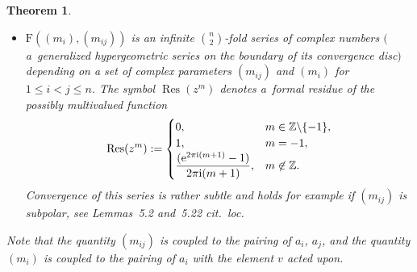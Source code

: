 \documentclass[10pt,a4paper]{amsart}
\numberwithin{equation}{section}
\newtheorem{teo}{Theorem}[section]
\newcommand{\Z}{\mathbb{Z}}
\newcommand{\Fp}{\mathrm{F}}
\begin{document}
\begin{teo}
\begin{itemize}
\begin{itemize}
	\end{itemize}
	\item $\Fp((m_i),(m_{ij}))$ is an infinite ${n\choose 2}$-fold series of complex numbers $($a~generalized hypergeometric series on the boundary of its convergence disc$)$ depending on a set of complex parameters $(m_{ij})$ and $(m_i)$ for $1\leq i<j\leq n$. The symbol $\operatorname{Res}(z^m)$ denotes a~formal residue of the possibly multivalued function
	\[\operatorname{Res}(z^m)
	 :=  \begin{cases}
	0, & m\in\Z \backslash\{-1\},\\
	1, & m= -1,\\
	\dfrac{({\rm e}^{2\pi{\rm i} (m+1)}-1)}{2\pi{\rm i}(m+1)},
	& m\not\in\Z.
	\end{cases}\]
	Convergence of this series is rather subtle and holds for example if $(m_{ij})$ is subpolar, see Lemmas~{\rm 5.2} and~{\rm 5.22} cit.~loc.
	\end{itemize}
Note that the quantity $(m_{ij})$ is coupled to the pairing of $a_i$, $a_j$, and the quantity $(m_i)$ is coupled to the pairing of $a_i$ with the element $v$ acted upon.
\end{teo}
\end{document}
